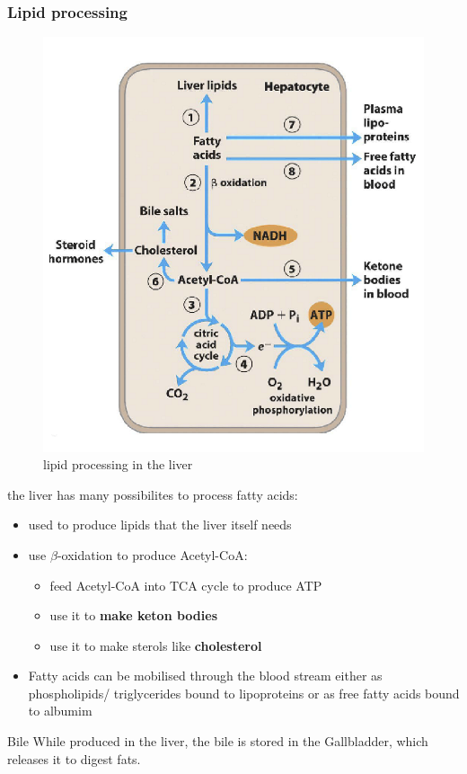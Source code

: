 \documentclass[../main.tex]{subfiles}
\begin{document}
\subsubsection{Lipid processing}
\begin{figure}[H]
    \centering
    \includegraphics[width=0.5\linewidth]{liverLipids.png}
    \caption{lipid processing in the liver}
    \label{fig:enter-label}
\end{figure}
the liver has many possibilites to process fatty acids:
\begin{itemize}
    \item used to produce lipids that the liver itself needs
    \item use $\beta$-oxidation to produce Acetyl-CoA:
    \begin{itemize}
        \item feed Acetyl-CoA into TCA cycle to produce ATP
        \item use it to \textbf{make keton bodies}
        \item use it to make sterols like \textbf{cholesterol}
    \end{itemize}
    \item Fatty acids can be mobilised through the blood stream either as phospholipids/ triglycerides bound to lipoproteins or as free fatty acids bound to albumim
   
\end{itemize}

\begin{RemarkWithTitel}{Bile}
	While produced in the liver, the bile is stored in the Gallbladder, which releases it to digest fats.
\end{RemarkWithTitel}
\end{document}
